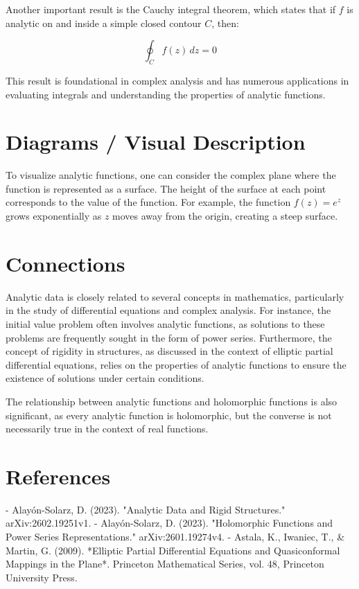 \documentclass[11pt,a4paper]{article}
\begin{document}
Another important result is the Cauchy integral theorem, which states that if \( f \) is analytic on and inside a simple closed contour \( C \), then:

\begin{equation}
\oint_C f(z) \, dz = 0
\end{equation}

This result is foundational in complex analysis and has numerous applications in evaluating integrals and understanding the properties of analytic functions.

\section{Diagrams / Visual Description}
To visualize analytic functions, one can consider the complex plane where the function is represented as a surface. The height of the surface at each point corresponds to the value of the function. For example, the function \( f(z) = e^z \) grows exponentially as \( z \) moves away from the origin, creating a steep surface.

\section{Connections}
Analytic data is closely related to several concepts in mathematics, particularly in the study of differential equations and complex analysis. For instance, the initial value problem often involves analytic functions, as solutions to these problems are frequently sought in the form of power series. Furthermore, the concept of rigidity in structures, as discussed in the context of elliptic partial differential equations, relies on the properties of analytic functions to ensure the existence of solutions under certain conditions.

The relationship between analytic functions and holomorphic functions is also significant, as every analytic function is holomorphic, but the converse is not necessarily true in the context of real functions.

\section{References}
- Alayón-Solarz, D. (2023). "Analytic Data and Rigid Structures." arXiv:2602.19251v1.
- Alayón-Solarz, D. (2023). "Holomorphic Functions and Power Series Representations." arXiv:2601.19274v4.
- Astala, K., Iwaniec, T., & Martin, G. (2009). *Elliptic Partial Differential Equations and Quasiconformal Mappings in the Plane*. Princeton Mathematical Series, vol. 48, Princeton University Press.
\end{document}
